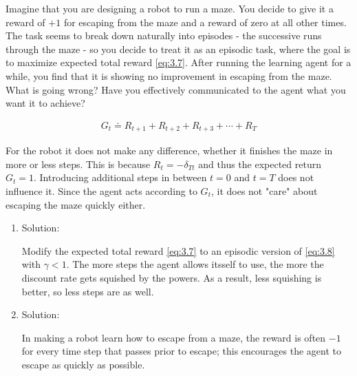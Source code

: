
\begin{exercise}[Exercise 3.7]

Imagine that you are designing a robot to run a maze.
You decide to give it a reward of $+1$ for escaping from the maze and a reward of zero at all other times.
The task seems to break down naturally into episodes - the successive runs through the maze - so you decide to treat it as an episodic task, where the goal is to maximize expected total reward \eqref{eq:3.7}.
After running the learning agent for a while, you find that it is showing no improvement in escaping from the maze.
What is going wrong?
Have you effectively communicated to the agent what you want it to achieve?

\end{exercise}


\begin{solution}

\begin{align} \label{eq:3.7} \tag{3.7}
    G_t \doteq R_{t+1} + R_{t+2} + R_{t+3} + \cdots + R_T
\end{align}

For the robot it does not make any difference, whether it finishes the maze in more or less steps.
This is because $R_t = -\delta_{T t}$ and thus the expected return $G_t = 1$.
Introducing additional steps in between $t = 0$ and $t = T$ does not influence it.
Since the agent acts according to $G_t$, it does not "care" about escaping the maze quickly either.

\begin{enumerate}[label = \arabic*.]

    \item Solution:

    Modify the expected total reward \eqref{eq:3.7} to an episodic version of \eqref{eq:3.8} with $\gamma < 1$.
	The more steps the agent allows itsself to use, the more the discount rate gets squished by the powers.
	As a result, less squishing is better, so less steps are as well.

    \item Solution:

    \begin{displayquote}
        In making a robot learn how to escape from a maze, the reward is often $-1$ for every time step that passes prior to escape; this encourages the agent to escape as quickly as possible.
    \end{displayquote}

\end{enumerate}

\end{solution}

